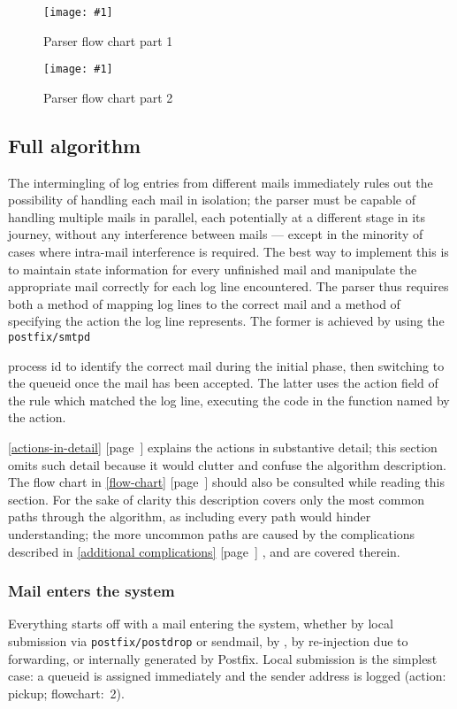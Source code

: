 \documentclass[a4paper,12pt,draft]{article}
\newcommand{\showgraph}[3]{
    \begin{figure}[hbt!]
        \caption{#2}\label{#3}
        \texttt{[image: \#1]}
    \end{figure}
}
\newcommand{\refwithpage}[1]{%
    \empty{}\ref{#1} [page~\pageref{#1}]%
}
\newcommand{\sectionref}[1]{%
    \textsection{}\refwithpage{#1}%
}
\newcommand{\daemon}[1]{%
    \texttt{postfix/#1}%
}
\begin{document}
\showgraph{build/logparser-flow-chart-part-1}{Parser flow chart part
1}{flow chart image part 1}

\showgraph{build/logparser-flow-chart-part-2}{Parser flow chart part
2}{flow chart image part 2}

\clearpage

\subsection{Full algorithm}

\label{full-algorithm}

The intermingling of log entries from different mails immediately rules out
the possibility of handling each mail in isolation; the parser must be
capable of handling multiple mails in parallel, each potentially at a
different stage in its journey, without any interference between mails ---
except in the minority of cases where intra-mail interference is required.
The best way to implement this is to maintain state information for every
unfinished mail and manipulate the appropriate mail correctly for each log
line encountered.  The parser thus requires both a method of mapping log
lines to the correct mail and a method of specifying the action the log
line represents.  The former is achieved by using the \daemon{smtpd}
process id to identify the correct mail during the initial phase, then
switching to the queueid once the mail has been accepted.  The latter uses
the action field of the rule which matched the log line, executing the code
in the function named by the action.

\sectionref{actions-in-detail} explains the actions in substantive detail;
this section omits such detail because it would clutter and confuse the
algorithm description.  The flow chart in \sectionref{flow-chart} should
also be consulted while reading this section.  For the sake of clarity this
description covers only the most common paths through the algorithm, as
including every path would hinder understanding; the more uncommon paths
are caused by the complications described in \sectionref{additional
complications}, and are covered therein.

\subsubsection{Mail enters the system}

\label{mail-enters-the-system}

Everything starts off with a mail entering the system, whether by local
submission via \daemon{postdrop} or sendmail, by \SMTP{}, by re-injection
due to forwarding, or internally generated by Postfix.  Local submission is
the simplest case: a queueid is assigned immediately and the sender address
is logged (action: pickup; flowchart:~2).
\end{document}
